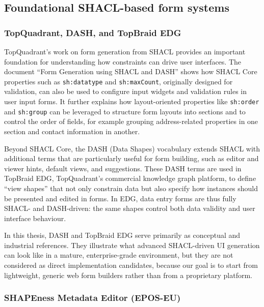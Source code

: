 \subsection{Foundational SHACL-based form systems}

\subsubsection{TopQuadrant, DASH, and TopBraid EDG}

TopQuadrant's work on form generation from SHACL provides an important foundation for understanding how constraints can drive user interfaces. The document ``Form Generation using SHACL and DASH'' shows how SHACL Core properties such as \texttt{sh:datatype} and \texttt{sh:maxCount}, originally designed for validation, can also be used to configure input widgets and validation rules in user input forms. It further explains how layout-oriented properties like \texttt{sh:order} and \texttt{sh:group} can be leveraged to structure form layouts into sections and to control the order of fields, for example grouping address-related properties in one section and contact information in another.\cite{dash-forms}

Beyond SHACL Core, the DASH (Data Shapes) vocabulary extends SHACL with additional terms that are particularly useful for form building, such as editor and viewer hints, default views, and suggestions.\cite{dash-spec} These DASH terms are used in TopBraid EDG, TopQuadrant's commercial knowledge graph platform, to define ``view shapes'' that not only constrain data but also specify how instances should be presented and edited in forms.\cite{topbraid-edg} In EDG, data entry forms are thus fully SHACL- and DASH-driven: the same shapes control both data validity and user interface behaviour.

In this thesis, DASH and TopBraid EDG serve primarily as conceptual and industrial references. They illustrate what advanced SHACL-driven UI generation can look like in a mature, enterprise-grade environment, but they are not considered as direct implementation candidates, because our goal is to start from lightweight, generic web form builders rather than from a proprietary platform.


\subsubsection{SHAPEness Metadata Editor (EPOS-EU)}

